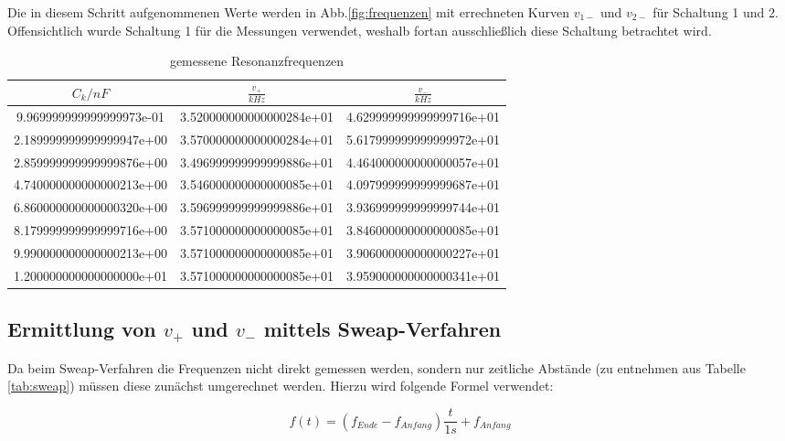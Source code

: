 Die in diesem Schritt aufgenommenen Werte werden in Abb.\ref{fig:frequenzen} mit errechneten Kurven $v_{1-}$ und $v_{2-}$ für Schaltung 1 und 2. Offensichtlich wurde Schaltung 1 für die Messungen verwendet, weshalb fortan ausschließlich diese Schaltung betrachtet wird.

\begin{table}
  \centering
\caption{gemessene Resonanzfrequenzen}
\label{tab:verhaeltnisse}
\begin{tabular}{S S S}
  \toprule
  {$C_k/nF$} & {$\frac{v_+}{kHz}$} & {$\frac{v_-}{kHz}$}\\
  \midrule
  9.969999999999999973e-01 & 3.520000000000000284e+01 & 4.629999999999999716e+01\\
  2.189999999999999947e+00 & 3.570000000000000284e+01 & 5.617999999999999972e+01\\
  2.859999999999999876e+00 & 3.496999999999999886e+01 & 4.464000000000000057e+01\\
  4.740000000000000213e+00 & 3.546000000000000085e+01 & 4.097999999999999687e+01\\
  6.860000000000000320e+00 & 3.596999999999999886e+01 & 3.936999999999999744e+01\\
  8.179999999999999716e+00 & 3.571000000000000085e+01 & 3.846000000000000085e+01\\
  9.990000000000000213e+00 & 3.571000000000000085e+01 & 3.906000000000000227e+01\\
  1.200000000000000000e+01 & 3.571000000000000085e+01 & 3.959000000000000341e+01\\
\bottomrule
\end{tabular}
\end{table}
\FloatBarrier


\subsection{Ermittlung von $v_+$ und $v_-$ mittels Sweap-Verfahren}
\label{sec:sweap}

Da beim Sweap-Verfahren die Frequenzen nicht direkt gemessen werden, sondern nur zeitliche Abstände (zu entnehmen aus Tabelle \ref{tab:sweap}) müssen diese zunächst umgerechnet werden. Hierzu wird folgende Formel verwendet:

\begin{equation}
  f(t) = ( f_{Ende} - f_{Anfang} ) \frac{t}{1s} + f_{Anfang}
\end{equation}


